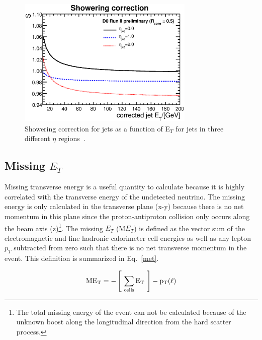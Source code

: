 \begin{itemize}
\begin{figure}[!h!tbp]
\begin{center}
\includegraphics[width=0.75\textwidth]{eps/Reco/JES-shower.eps}
\end{center}
\vspace{-0.1in}
\caption{Showering correction for jets as a function of E$_{T}$ for jets in three different $\eta$ regions~\cite{jes}.}
\label{jes-shower}
\end{figure}

\end{itemize}

\subsection{Missing $E_{T}$}
\label{metreco}

Missing transverse energy is a useful quantity to calculate because it is highly correlated with the transverse energy of the undetected neutrino. The missing energy is only calculated in the transverse plane (x-y) because there is no net momentum in this plane since the proton-antiproton collision only occurs along the beam axis (z)\footnote{The total missing energy of the event can not be calculated because of the unknown boost along the longitudinal direction from the hard scatter process.}.  The missing $E_{T}$ (M$E_{T}$) is defined as the vector sum of the electromagnetic and fine hadronic calorimeter cell energies as well as any lepton $p_{T}$ subtracted from zero such that there is no net transverse momentum in the event. This definition is summarized in Eq.~\ref{met}.

\begin{equation}
\label{met}
\rm{M}E_{T} = -\left[~\sum_{\rm{cells}} E_{T}~\right] - p_{T}(\ell)
\end{equation}

